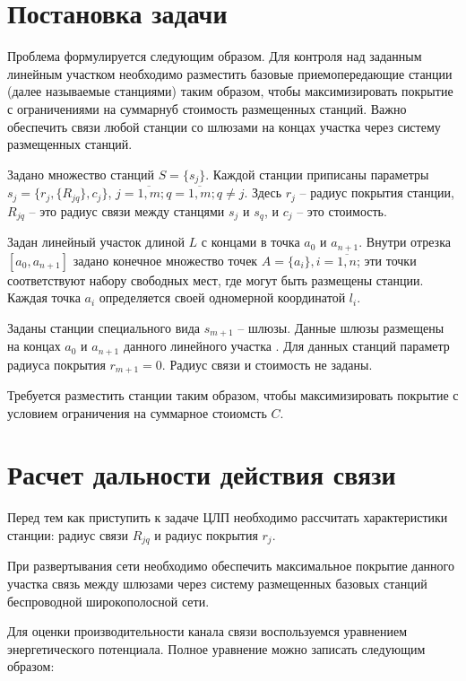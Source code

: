 \section{Постановка задачи}

Проблема формулируется следующим образом. Для контроля над заданным линейным участком необходимо разместить базовые приемопередающие станции (далее называемые станциями) таким образом, чтобы максимизировать покрытие с ограничениями на суммарнуб стоимость размещенных станций. Важно обеспечить связи любой станции со шлюзами на концах участка через систему размещенных станций.

Задано множество станций $S = \{s_j\}$. Каждой станции приписаны параметры $s_j = \{r_j, \{R_{jq}\}, c_j \}$, $j = \overline{1,m}; q = \overline{1,m}; q \neq j$. Здесь $r_j$ -- радиус покрытия станции, $R_{jq}$ -- это радиус связи между станцями $s_j$ и $s_q$, и $c_j$ -- это стоимость. 

Задан линейный участок длиной $L$ с концами в точка $a_0$ и $a_{n+1}$. Внутри  отрезка $[a_0, a_{n+1}]$ задано конечное множество точек $A=\{a_i\}, i=\overline{1,n}$; эти точки соответствуют набору свободных мест, где могут быть размещены станции. Каждая точка $a_i$ определяется своей одномерной координатой $l_i$.

Заданы станции специального вида $s_{m+1}$ -- шлюзы. Данные шлюзы размещены на концах $a_0$ и $a_{n+1}$ данного линейного участка . Для данных станций параметр радиуса покрытия $r_{m+1}=0$. Радиус связи и стоимость не заданы.

Требуется разместить станции таким образом, чтобы максимизировать покрытие с условием ограничения на суммарное стоиомсть $C$.

 

\section{Расчет дальности действия связи}


Перед тем как приступить к задаче ЦЛП необходимо рассчитать характеристики станции: радиус связи $R_{jq}$ и радиус покрытия $r_j$.

При развертывания сети необходимо обеспечить максимальное покрытие данного участка связь между шлюзами через систему размещенных базовых станций беспроводной широкополосной сети.

Для оценки производительности канала связи воспользуемся уравнением энергетического потенциала. Полное уравнение можно записать следующим образом:

